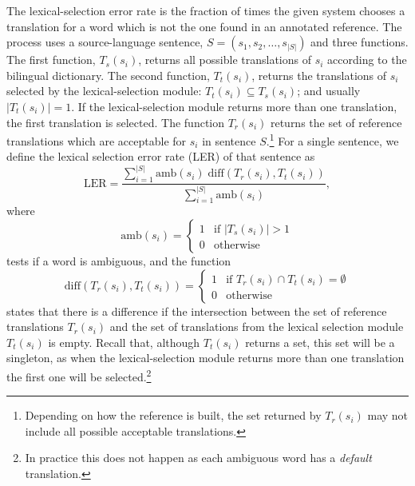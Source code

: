 \documentclass[11pt]{article}
\newcommand{\comment}[1]{\todo{#1}}
\begin{document}

The lexical-selection error rate is the fraction of times the given
system chooses a translation for a word which is not  the one found in an
annotated reference. The process uses a source-language sentence, $S =
(s_1, s_2, \ldots, s_{|S|})$ and three functions. The first function,
$T_s(s_i)$, returns all possible translations of $s_i$ according to
the bilingual dictionary. The second function, $T_t(s_i)$, returns the
translations of $s_i$ selected by the lexical-selection module:
$T_t(s_i) \subseteq T_s(s_i)$; and usually $|T_t(s_i)| = 1$. If the
lexical-selection module returns more than one translation, the first
translation is selected. 
The
function $T_r(s_i)$ returns the set of reference translations which
are acceptable for $s_i$ in sentence $S$.\footnote{Depending on how
  the reference is built, the set returned by $T_r(s_i)$ %
  may not include all possible
  acceptable translations.} For a
single sentence, we define the lexical selection error rate (LER) of
that sentence as
\begin{equation}
\mathrm{LER} = \frac{\sum_{i=1}^{|S|} \mathrm{amb}(s_i)\; \mathrm{diff}(T_r(s_i), T_t(s_i))}{\sum_{i=1}^{|S|} \mathrm{amb}(s_i)},
\label{eq:ler}
\end{equation}
where
\begin{equation}
\mathrm{amb}(s_i) = \left \{ \begin{matrix}
                 1 & \mbox{if } |T_s(s_i)| > 1   \\
                 0 & \mbox{otherwise} \end{matrix} \right.
\label{eq:amb}
\end{equation}
 tests if a word is ambiguous, and the  function 
\begin{equation}
\mathrm{diff}(T_r(s_i), T_t(s_i)) = \left \{ \begin{matrix}
                 1 & \mbox{if } T_r(s_i) \cap T_t(s_i) = \emptyset   \\
                 0 & \mbox{otherwise} \end{matrix} \right.
\label{eq:diff}
\end{equation}
states that there is a difference if the intersection between the set
of reference translations $T_r(s_i)$ and the set of translations from
the lexical selection module $T_t(s_i)$ is empty.  Recall that,
although $T_t(s_i)$ returns a set, this set will be a singleton, as
when the lexical-selection module returns more than one translation
the first one will be selected.\footnote{In practice this does not happen
as each ambiguous word has a \emph{default} translation.} 
\end{document}
